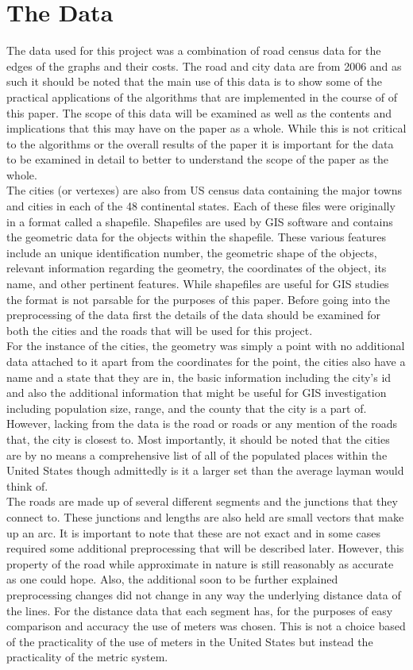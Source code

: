 \documentclass[midd]{thesis}
\newcommand{\tab}{\hspace*{2em}}
\begin{document}
\section{The Data}
\tab The data used for this project was a combination of road census data for the edges of the graphs and their costs. The road and city data are from 2006 and as such it should be noted that the main use of this data is to show some of the practical applications of the algorithms that are implemented in the course of of this paper. The scope of this data will be examined as well as the contents and implications that this may have on the paper as a whole. While this is not critical to the algorithms or the overall results of the paper it is important for the data to be examined in detail to better to understand the scope of the paper as the whole.\\
\tab The cities (or vertexes) are also from US census data containing the major towns and cities in each of the 48 continental states.  Each of these files were originally in a format called a shapefile. Shapefiles are used by GIS software and contains the geometric data for the objects within the shapefile. These various features include an unique identification number, the geometric shape of the objects, relevant information regarding the geometry, the coordinates of the object, its name, and other pertinent features. While shapefiles are useful for GIS studies the format is not parsable for the purposes of this paper. Before going into the preprocessing of the data first the details of the data should be examined for both the cities and the roads that will be used for this project.\\
\tab For the instance of the cities, the geometry was simply a point with no additional data attached to it apart from the coordinates for the point, the cities also have a name and a state that they are in, the basic information including the city's id and also the additional information that might be useful for GIS investigation including population size, range, and the county that the city is a part of. However, lacking from the data is the road or roads or any mention of the roads that, the city is closest to. Most importantly, it should be noted that the cities are by no means a comprehensive list of all of the populated places within the United States though admittedly is it a larger set than the average layman would think of.\\
\tab The roads are made up of several different segments and the junctions that they connect to. These junctions and lengths are also held are small vectors that make up an arc. It is important to note that these are not exact and in some cases required some additional preprocessing that will be described later. However, this property of the road while approximate in nature is still reasonably as accurate as one could hope. Also, the additional soon to be further explained preprocessing changes did not change in any way the underlying distance data of the lines. For the distance data that each segment has, for the purposes of easy comparison and accuracy the use of meters was chosen. This is not a choice based of the practicality of the use of meters in the United States but instead the practicality of the metric system.\\
\end{document}
